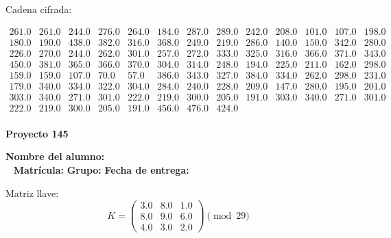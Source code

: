 \documentclass[12pt]{article}
\begin{document}
Cadena cifrada:
\begin{center}
$\begin{array}{lllllllllllll}
261.0 & 261.0 & 244.0 & 276.0 & 264.0 & 184.0 & 287.0 & 289.0 & 242.0 & 208.0 & 101.0 & 107.0 & 198.0\\
180.0 & 190.0 & 438.0 & 382.0 & 316.0 & 368.0 & 249.0 & 219.0 & 286.0 & 140.0 & 150.0 & 342.0 & 280.0\\
226.0 & 270.0 & 244.0 & 262.0 & 301.0 & 257.0 & 272.0 & 333.0 & 325.0 & 316.0 & 366.0 & 371.0 & 343.0\\
450.0 & 381.0 & 365.0 & 366.0 & 370.0 & 304.0 & 314.0 & 248.0 & 194.0 & 225.0 & 211.0 & 162.0 & 298.0\\
159.0 & 159.0 & 107.0 & 70.0 & 57.0 & 386.0 & 343.0 & 327.0 & 384.0 & 334.0 & 262.0 & 298.0 & 231.0\\
179.0 & 340.0 & 334.0 & 322.0 & 304.0 & 284.0 & 240.0 & 228.0 & 209.0 & 147.0 & 280.0 & 195.0 & 201.0\\
303.0 & 340.0 & 271.0 & 301.0 & 222.0 & 219.0 & 300.0 & 205.0 & 191.0 & 303.0 & 340.0 & 271.0 & 301.0\\
222.0 & 219.0 & 300.0 & 205.0 & 191.0 & 456.0 & 476.0 & 424.0\\
\end{array}$
\end{center}

\newpage


\textbf{Proyecto 145}

\textbf{Nombre del alumno:} \underline{\hspace{13cm}}\\\
\vspace{1cm}
\textbf{Matrícula:} \underline{\hspace{4cm}} \hspace{1cm}
\textbf{Grupo:} \underline{\hspace{2cm}}
\textbf{Fecha de entrega:} \underline{\hspace{2cm}}

\medskip

Matriz llave:
\[
K = \begin{pmatrix}
3.0 & 8.0 & 1.0\\
8.0 & 9.0 & 6.0\\
4.0 & 3.0 & 2.0
\end{pmatrix} \pmod{29}
\]
\end{document}
